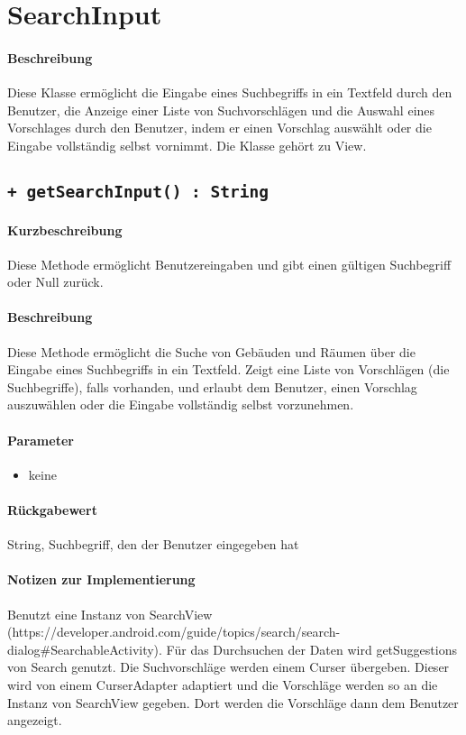 \section{SearchInput}
\paragraph*{Beschreibung}
Diese Klasse ermöglicht die Eingabe eines Suchbegriffs in ein Textfeld durch den Benutzer, 
die Anzeige einer Liste von Suchvorschlägen und die Auswahl eines Vorschlages durch den Benutzer, 
indem er einen Vorschlag auswählt oder die Eingabe vollständig selbst vornimmt.
Die Klasse gehört zu View.

\subsection{\texttt{+ getSearchInput() : String}}%
\paragraph*{Kurzbeschreibung}
Diese Methode ermöglicht Benutzereingaben und gibt einen gültigen Suchbegriff oder Null zurück.
\paragraph*{Beschreibung}
Diese Methode ermöglicht die Suche von Gebäuden und Räumen über die Eingabe eines Suchbegriffs in ein Textfeld.
Zeigt eine Liste von Vorschlägen (die Suchbegriffe), falls vorhanden, und erlaubt dem Benutzer, einen Vorschlag auszuwählen oder die Eingabe vollständig selbst vorzunehmen.
\paragraph*{Parameter}
\begin{itemize}
    \item keine
\end{itemize}
\paragraph*{Rückgabewert}
String, Suchbegriff, den der Benutzer eingegeben hat
\paragraph*{Notizen zur Implementierung}
Benutzt eine Instanz von SearchView (https://developer.android.com/guide/topics/search/search-dialog#SearchableActivity).
Für das Durchsuchen der Daten wird getSuggestions von Search genutzt.
Die Suchvorschläge werden einem Curser übergeben.
Dieser wird von einem CurserAdapter adaptiert und die Vorschläge werden so an die Instanz von SearchView gegeben.
Dort werden die Vorschläge dann dem Benutzer angezeigt.


